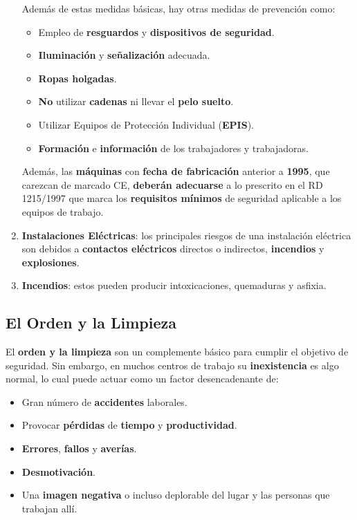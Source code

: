 \begin{enumerate}
    Además de estas medidas básicas, hay otras medidas de prevención como:

    \begin{itemize}
        \item Empleo de \textbf{resguardos} y \textbf{dispositivos de seguridad}.
        \item \textbf{Iluminación} y \textbf{señalización} adecuada.
        \item \textbf{Ropas holgadas}.
        \item \textbf{No} utilizar \textbf{cadenas} ni llevar el \textbf{pelo suelto}.
        \item Utilizar Equipos de Protección Individual (\textbf{EPIS}).
        \item \textbf{Formación} e \textbf{información} de los trabajadores y trabajadoras.
    \end{itemize}

    Además, las \textbf{máquinas} con \textbf{fecha de fabricación} anterior a \textbf{1995}, que carezcan de marcado CE, \textbf{deberán adecuarse} a lo prescrito en el RD 1215/1997 que marca los \textbf{requisitos mínimos} de seguridad aplicable a los equipos de trabajo.

    \item \textbf{Instalaciones Eléctricas}: los principales riesgos de una instalación eléctrica son debidos a \textbf{contactos eléctricos}  directos o indirectos, \textbf{incendios} y \textbf{explosiones}.
    \item \textbf{Incendios}: estos pueden producir intoxicaciones, quemaduras y asfixia.
\end{enumerate}

\subsection{El Orden y la Limpieza}
El \textbf{orden y la limpieza} son un complemente básico para cumplir el objetivo de seguridad. Sin embargo, en muchos centros de trabajo su \textbf{inexistencia} es algo normal, lo cual puede actuar como un factor desencadenante de:

\begin{itemize}
    \item Gran número de \textbf{accidentes} laborales.
    \item Provocar \textbf{pérdidas} de \textbf{tiempo} y \textbf{productividad}.
    \item \textbf{Errores}, \textbf{fallos} y \textbf{averías}.
    \item \textbf{Desmotivación}.
    \item Una \textbf{imagen negativa} o incluso deplorable del lugar y las personas que trabajan allí.
\end{itemize}

